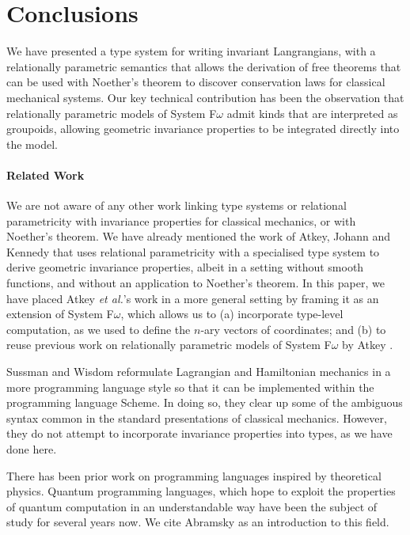 \documentclass[preprint]{sigplanconf}
\theoremstyle{examplestyle}
\begin{document}
\section{Conclusions}
\label{sec:conclusions}

We have presented a type system for writing invariant Langrangians,
with a relationally parametric semantics that allows the derivation of
free theorems that can be used with Noether's theorem to discover
conservation laws for classical mechanical systems. Our key technical
contribution has been the observation that relationally parametric
models of System F$\omega$ admit kinds that are interpreted as
groupoids, allowing geometric invariance properties to be integrated
directly into the model.

\paragraph{Related Work} We are not aware of any other work linking
type systems or relational parametricity with invariance properties
for classical mechanics, or with Noether's theorem. We have already
mentioned the work of Atkey, Johann and Kennedy
\cite{atkey13abstraction} that uses relational parametricity with a
specialised type system to derive geometric invariance properties,
albeit in a setting without smooth functions, and without an
application to Noether's theorem. In this paper, we have placed Atkey
\emph{et al.}'s work in a more general setting by framing it as an
extension of System F$\omega$, which allows us to (a) incorporate
type-level computation, as we used to define the $n$-ary vectors of
coordinates; and (b) to reuse previous work on relationally parametric
models of System F$\omega$ by Atkey \cite{atkey12relational}.

Sussman and Wisdom \cite{sussman01structure} reformulate Lagrangian
and Hamiltonian mechanics in a more programming language style so that
it can be implemented within the programming language Scheme. In doing
so, they clear up some of the ambiguous syntax common in the standard
presentations of classical mechanics. However, they do not attempt to
incorporate invariance properties into types, as we have done here.

There has been prior work on programming languages inspired by
theoretical physics. Quantum programming languages, which hope to
exploit the properties of quantum computation in an understandable way
have been the subject of study for several years now. We cite Abramsky
\cite{abramsky04} as an introduction to this field.
\end{document}

